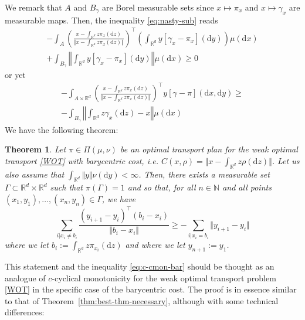 \documentclass[leqno, 11pt, a4paper]{amsart}
\newtheorem{thm}{Theorem}
\theoremstyle{definition}
\newcommand{\R}{\mathbb{R}}
\newcommand{\N}{\mathbb{N}}
\newcommand{\dd}{\mathrm{d}}
\begin{document}
	We remark that $A$ and $B_\gamma$ are Borel measurable sets since $x \mapsto \pi_x$ and $x \mapsto \gamma_x$ are measurable maps. Then, the inequality \eqref{eq:nasty-sub} reads 
	\begin{multline}
		-\int_{A} \left(\frac{x - \int_{\R^d} z \pi_x(\dd z)}{\Vert x - \int_{\R^d} z \pi_x(\dd z) \Vert}\right)^\intercal\left( \int_{\R^d} y [\gamma_x - \pi_x](\dd y) \right) \mu(\dd x) 
		\\ + \int_{B_\gamma} \left\Vert \int_{\R^d} y [\gamma_x - \pi_x](\dd y)\right\Vert \mu(\dd x) \geq 0
	\end{multline}
	or yet
	\begin{multline}\label{eq:eq33_duh}
		-\int_{A \times \R^d} \left(\frac{x - \int_{\R^d} z \pi_x(\dd z)}{\Vert x - \int_{\R^d} z \pi_x(\dd z) \Vert}\right)^\intercal y [\gamma - \pi](\dd x, \dd y) \geq\\ - \int_{B_\gamma} \left\Vert \int_{\R^d} z \gamma_x(\dd z) - x\right\Vert \mu(\dd x)
	\end{multline}
	We have the following theorem:
	\begin{thm}\label{thm:nec-cmon-bar}
		Let $\pi \in \Pi(\mu, \nu)$ be an optimal transport plan for the weak optimal transport \eqref{WOT} with barycentric cost, \textit{i.e.} $C(x, \rho)= \Vert x - \int_{\R^d} z \rho(\dd z)\Vert$. Let us also assume that $\int_{\R^d} \Vert y \Vert \nu(\dd y) < \infty$. Then, there exists a measurable set $\Gamma \subset \R^d \times \R^d$ such that $\pi(\Gamma) = 1$ and so that, for all $n \in \N$ and all points $(x_1, y_1), \dots, (x_n, y_n) \in \Gamma$, we have 
		\begin{equation}\label{eq:c-cmon-bar}
		\boxed{\sum_{i | x_i \neq b_i} \frac{(y_{i+1} - y_i)^\intercal(b_i - x_i)}{\Vert b_i - x_i \Vert} \geq -\sum_{i | x_i = b_i} \Vert y_{i+1} -y_{i} \Vert}
		\end{equation}
	where we let $b_i := \int_{\R^d} z\pi_{x_i}(\dd z)$ and where we let $y_{n+1} := y_1$. 
	\end{thm}
	This statement and the inequality \eqref{eq:c-cmon-bar} should be thought as an analogue of $c$-cyclical monotonicity for the weak optimal transport problem \eqref{WOT} in the specific case of the barycentric cost. The proof is in essence similar to that of Theorem~\ref{thm:best-thm-necessary}, although with some technical differences:
\end{document}
